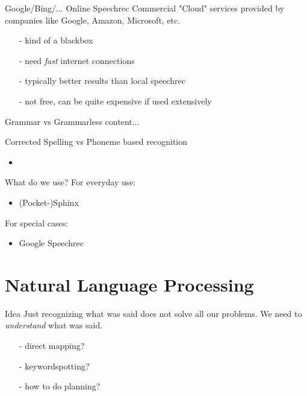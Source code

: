 \documentclass{beamer}
\begin{document}
	\begin{frame}{Google/Bing/... Online Speechrec}
		Commercial "Cloud" services provided by companies like Google, Amazon, Microsoft, etc.
		\begin{itemize}
			\item[-] kind of a blackbox
			\item[-] need \emph{fast} internet connections
			\item[-] typically better results than local speechrec
			\item[-] not free, can be quite expensive if used extensively
		\end{itemize}
	\end{frame}
	
	
	\begin{frame}{Grammar vs Grammarless}
		content...
	\end{frame}
	
	\begin{frame}{Corrected Spelling vs Phoneme based recognition}
		\begin{itemize}
			\item 
		\end{itemize}
	\end{frame}
	
	\begin{frame}{What do we use?}
		For everyday use:
		\pause
		\begin{itemize}
			\item (Pocket-)Sphinx
		\end{itemize}
		
		For special cases:
		\pause
		\begin{itemize}
			\item Google Speechrec
		\end{itemize}
	\end{frame}
	
	\section{Natural Language Processing}%
	
	\begin{frame}{Idea}
		Just recognizing what was said does not solve all our problems. We need to \emph{understand} what was said.
		\pause
		\begin{itemize}
			\item[-] direct mapping?
			\pause
			\item[-] keywordspotting?
			\pause
			\item[-] how to do planning?
		\end{itemize}
	\end{frame}
	
\end{document}
